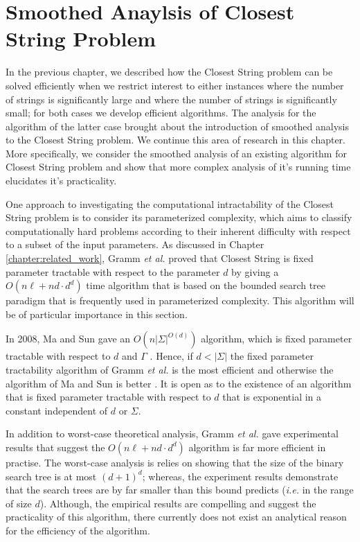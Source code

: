 \chapter{Smoothed Anaylsis of {\sc Closest String} Problem}\label{chapter:smoothed_analysis}

In the previous chapter, we described how the {\sc Closest String} problem can be solved efficiently when we restrict interest to either instances where the number of strings is significantly large and where the number of strings is significantly small; for both cases we develop efficient algorithms.  The analysis for the algorithm of the latter case brought about the introduction of smoothed analysis to the {\sc Closest String} problem. We continue this area of research in this chapter.  More specifically, we consider the smoothed analysis of an existing algorithm for {\sc Closest String} problem and show that more complex analysis of it's running time elucidates it's practicality.  

One approach to investigating the computational intractability of the {\sc Closest String} problem is to consider its parameterized complexity, which aims to classify computationally hard problems according to their inherent difficulty with respect to a subset of the input parameters. As discussed in Chapter \ref{chapter:related_work}, Gramm {\em et al.} \cite{GNR03} proved that {\sc Closest String} is fixed parameter tractable with respect to the parameter $d$ by giving a $O(n\ell + nd \cdot d^d)$ time algorithm that is based on the bounded search tree paradigm that is frequently used in parameterized complexity.  This algorithm will be of particular importance in this section. 

In 2008, Ma and Sun gave an $O(n |\Sigma|^{O(d)})$ algorithm, which is fixed parameter tractable with respect to $d$ and $\Gamma$ \cite{MS08}. Hence, if $d < |\Sigma|$ the fixed parameter tractability algorithm of Gramm {\em et al.} \cite{GNR03} is the most efficient and otherwise the algorithm of Ma and Sun is better \cite{MS08}.  It is open as to the existence of an algorithm that is fixed parameter tractable with respect to $d$ that is exponential in a constant independent of $d$ or $\Sigma$.  

In addition to worst-case theoretical analysis, Gramm {\em et al.} \cite{GNR03} gave experimental results that suggest the $O(n\ell + nd \cdot d^d)$ algorithm is far more efficient in practise.  The worst-case analysis is relies on showing that the size of the binary search tree is at most $(d + 1)^d$; whereas, the experiment results demonstrate that the search trees are by far smaller than this bound predicts ({\em i.e.} in the range of size $d$). Although, the empirical results are compelling and suggest the practicality of this algorithm, there currently does not exist an analytical reason for the efficiency of the algorithm.

